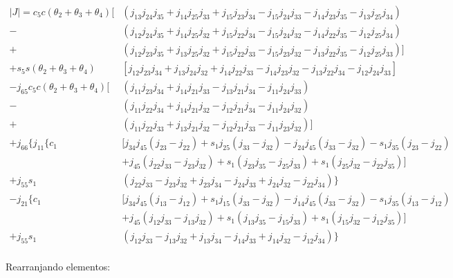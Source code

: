 \begin{align*}
    |J| = c_5c(\theta_2+\theta_3+\theta_4)[&(j_{13}j_{24}j_{35}+j_{14}j_{25}j_{33}+j_{15}j_{23}j_{34}-j_{15}j_{24}j_{33}-j_{14}j_{23}j_{35}-j_{13}j_{25}j_{34}) \\
                                          -&(j_{12}j_{24}j_{35}+j_{14}j_{25}j_{32}+j_{15}j_{22}j_{34}-j_{15}j_{24}j_{32}-j_{14}j_{22}j_{35}-j_{12}j_{25}j_{34}) \\
                                          +&(j_{12}j_{23}j_{35}+j_{13}j_{25}j_{32}+j_{15}j_{22}j_{33}-j_{15}j_{23}j_{32}-j_{13}j_{22}j_{35}-j_{12}j_{25}j_{33})] \\
          +s_5s(\theta_2+\theta_3+\theta_4)&[j_{12}j_{23}j_{34}+j_{13}j_{24}j_{32}+j_{14}j_{22}j_{33}-j_{14}j_{23}j_{32}-j_{13}j_{22}j_{34}-j_{12}j_{24}j_{33}] \\
    -j_{65}c_5c(\theta_2+\theta_3+\theta_4)[&(j_{11}j_{23}j_{34}+j_{14}j_{21}j_{33}-j_{13}j_{21}j_{34}-j_{11}j_{24}j_{33}) \\
                                          -&(j_{11}j_{22}j_{34}+j_{14}j_{21}j_{32}-j_{12}j_{21}j_{34}-j_{11}j_{24}j_{32}) \\
                                          +&(j_{11}j_{22}j_{33}+j_{13}j_{21}j_{32}-j_{12}j_{21}j_{33}-j_{11}j_{23}j_{32})] \\ 
    +j_{66}\{j_{11}\{c_1&[j_{34}j_{45}(j_{23}-j_{22})+s_1j_{25}(j_{33}-j_{32})-j_{24}j_{45}(j_{33}-j_{32})-s_1j_{35}(j_{23}-j_{22}) \\
                        &+j_{45}(j_{22}j_{33}-j_{23}j_{32}) + s_1(j_{23}j_{35}-j_{25}j_{33}) + s_1(j_{25}j_{32}-j_{22}j_{35})] \\
                +j_{55}s_1&(j_{22}j_{33}-j_{23}j_{32}+j_{23}j_{34}-j_{24}j_{33}+j_{24}j_{32}-j_{22}j_{34})\} \\
            -j_{21}\{c_1&[j_{34}j_{45}(j_{13}-j_{12})+s_1j_{15}(j_{33}-j_{32})-j_{14}j_{45}(j_{33}-j_{32})-s_1j_{35}(j_{13}-j_{12}) \\
                        &+j_{45}(j_{12}j_{33}-j_{13}j_{32}) + s_1(j_{13}j_{35}-j_{15}j_{33}) + s_1(j_{15}j_{32}-j_{12}j_{35})] \\
                +j_{55}s_1&(j_{12}j_{33}-j_{13}j_{32}+j_{13}j_{34}-j_{14}j_{33}+j_{14}j_{32}-j_{12}j_{34})\} \\            
\end{align*}

Rearranjando elementos:

